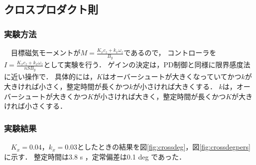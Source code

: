 \subsection{クロスプロダクト則}
\subsubsection{実験方法}
　目標磁気モーメントが$M = \frac{K_x c_z + k_x \omega_z}{B_y}$であるので，
コントローラを$I=\frac{K_x c_z + k_x \omega_z}{nSB_y}$として実験を行う．
ゲインの決定は，PD制御と同様に限界感度法に近い操作で．
具体的には，$K$はオーバーシュートが大きくなっていてかつ$k$が大きければ小さく，整定時間が長くかつ$k$が小さければ大きくする．
$k$は，オーバーシュートが大きくかつ$K$が小さければ大きく，整定時間が長くかつ$K$が大きければ小さくする．

\subsubsection{実験結果}
　$K_x=0.04$，$k_x=0.03$としたときの結果を図\ref{fig:crossdeg}，図\ref{fig:crossdegpers}に示す．
整定時間は3.8 s ，定常偏差は0.1 deg であった．

